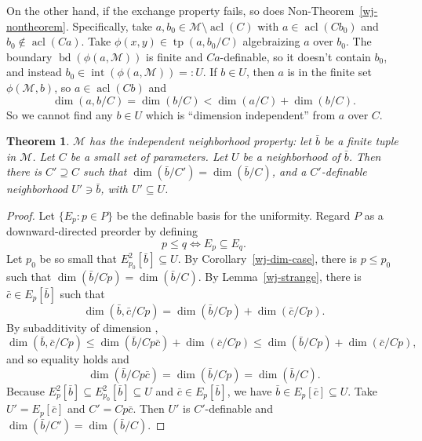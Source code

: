 \documentclass{amsart}
\newtheorem{theorem}{Theorem}[section]
\theoremstyle{definition}
\newcommand{\acl}{\operatorname{acl}}
\newcommand{\tp}{\operatorname{tp}}
\DeclareMathOperator{\bd}{bd}
\DeclareMathOperator{\inter}{int}
\begin{document}
On the other hand, if the exchange property fails, so does
Non-Theorem~\ref{wj-nontheorem}.  Specifically, take $a,b_0 \in \mathcal{M} \setminus
\acl(C)$ with $a \in \acl(Cb_0)$ and $b_0 \notin \acl(Ca)$.  Take
$\phi(x,y) \in \tp(a,b_0/C)$ algebraizing $a$ over $b_0$.  The
boundary $\bd(\phi(a,\mathcal{M}))$ is finite and $Ca$-definable, so it
doesn't contain $b_0$, and instead $b_0 \in \inter(\phi(a,\mathcal{M})) =: U$.
If $b \in U$, then $a$ is in the finite set $\phi(\mathcal{M},b)$, so $a \in
\acl(Cb)$ and
\begin{equation*}
  \dim(a,b/C) = \dim(b/C) < \dim(a/C) + \dim(b/C).
\end{equation*}
So we cannot find any $b \in U$ which is ``dimension independent''
from $a$ over $C$.



\begin{theorem} \label{wj-indep-nbhd}
$\mathcal{M}$ has the independent neighborhood property:
  let $\bar{b}$ be a finite tuple in $\mathcal{M}$.  Let $C$ be a small set of
  parameters.  Let $U$ be a neighborhood of $\bar{b}$.  Then there is $C'
  \supseteq C$ such that $\dim(\bar{b}/C') = \dim(\bar{b}/C)$, and a
  $C'$-definable neighborhood $U' \ni \bar{b}$, with $U' \subseteq U$.
\end{theorem}
\begin{proof}
  Let $\{E_p : p \in P\}$ be the definable basis for the uniformity.
  Regard $P$ as a downward-directed preorder by defining
  \begin{equation*}
    p \le q \iff E_p \subseteq E_q.
  \end{equation*}
  Let $p_0$ be so small that $E_{p_0}^2[\bar{b}] \subseteq U$.  By
  Corollary~\ref{wj-dim-case}, there is $p \le p_0$ such that
  $\dim(\bar{b}/Cp) = \dim(\bar{b}/C)$.  By Lemma~\ref{wj-strange},
  there is $\bar{c} \in E_p[\bar{b}]$ such that
  \begin{equation*}
    \dim(\bar{b},\bar{c}/Cp) = \dim(\bar{b}/Cp) + \dim(\bar{c}/Cp).
  \end{equation*}
  By subadditivity of dimension \cite[Proposition~2.31(5)]{t-minimal-johnson},
  \begin{equation*}
    \dim(\bar{b},\bar{c}/Cp) \le \dim(\bar{b}/Cp \bar{c}) + \dim(\bar{c}/Cp) \le \dim(\bar{b}/Cp) + \dim(\bar{c}/Cp),
  \end{equation*}
  and so equality holds and
  \begin{equation*}
    \dim(\bar{b}/C p \bar{c}) = \dim(\bar{b}/Cp) = \dim(\bar{b}/C).
  \end{equation*}
  Because $E_p^2[\bar{b}] \subseteq E_{p_0}^2[\bar{b}] \subseteq U$ and $\bar{c}
  \in E_p[\bar{b}]$, we have $\bar{b} \in E_p[\bar{c}] \subseteq U$.  Take $U' =
  E_p[\bar{c}]$ and $C' = Cp\bar{c}$.  Then $U'$ is $C'$-definable and
  $\dim(\bar{b}/C') = \dim(\bar{b}/C)$.
\end{proof}




\end{document}
